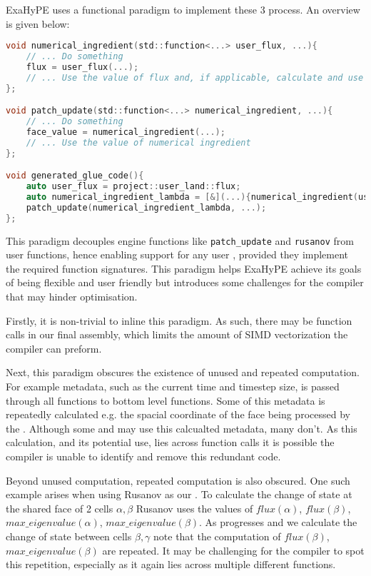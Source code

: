 ExaHyPE uses a functional paradigm to implement these 3 process.
An overview is given below:
\begin{lstlisting}[language=c]
void numerical_ingredient(std::function<...> user_flux, ...){
    // ... Do something
    flux = user_flux(...);
    // ... Use the value of flux and, if applicable, calculate and use NCP 
};

void patch_update(std::function<...> numerical_ingredient, ...){
    // ... Do something
    face_value = numerical_ingredient(...);
    // ... Use the value of numerical ingredient
};

void generated_glue_code(){
    auto user_flux = project::user_land::flux;
    auto numerical_ingredient_lambda = [&](...){numerical_ingredient(user_flux, ...)};
    patch_update(numerical_ingredient_lambda, ...);
};
\end{lstlisting}
This paradigm decouples engine functions like \lstinline{patch_update} and \lstinline{rusanov} from user functions, hence enabling support for any user , provided they implement the required function signatures.
This paradigm helps ExaHyPE achieve its goals of being flexible and user friendly but introduces some challenges for the compiler that may hinder optimisation.

Firstly, it is non-trivial to inline this paradigm.
As such, there may be function calls in our final assembly, which limits the amount of SIMD vectorization the compiler can preform.

Next, this paradigm obscures the existence of unused and repeated computation.
For example metadata, such as the current time and timestep size, is passed through all functions to bottom level  functions.
Some of this metadata is repeatedly calculated e.g. the spacial coordinate of the face being processed by the .
Although some  and  may use this calcualted metadata, many don't.
As this calculation, and its potential use, lies across function calls it is possible the compiler is unable to identify and remove this redundant code.

Beyond unused computation, repeated computation is also obscured.
One such example arises when using Rusanov as our .
To calculate the change of state at the shared face of 2 cells $\alpha,\beta$ Rusanov uses the values of $flux(\alpha)$, $flux(\beta)$, $max\_eigenvalue(\alpha)$, $max\_eigenvalue(\beta)$.
As  progresses and we calculate the change of state between cells $\beta,\gamma$ note that the computation of $flux(\beta)$, $max\_eigenvalue(\beta)$ are repeated.
It may be challenging for the compiler to spot this repetition, especially as it again lies across multiple different functions.


